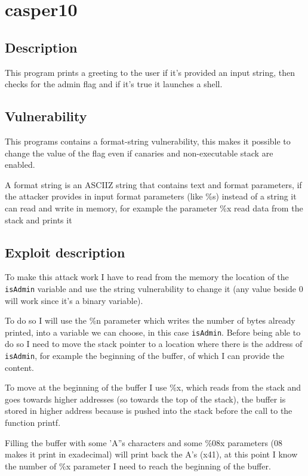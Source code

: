 \documentclass[a4paper,12pt]{article}
\begin{document}
\section{casper10}

\subsection{Description}
This program prints a greeting to the user if it's provided an input string, then checks for the admin flag and if it's true it launches a shell. 



\subsection{Vulnerability}

This programs contains a format-string vulnerability, this makes it possible to change the value of the flag even if canaries and non-executable stack are enabled.

A format string is an ASCIIZ string that contains text and format parameters, if the attacker provides in input format parameters (like \%s) instead of a string it can read and write in memory, for example the parameter \%x read data from the stack and prints it %

\subsection{Exploit description}

To make this attack work I have to read from the memory the location of the \texttt{isAdmin} variable and use the string vulnerability to change it (any value beside 0 will work since it's a binary variable). 

To do so I will use the \%n parameter which writes the number of bytes already printed, into a variable we can choose, in this case \texttt{isAdmin}. Before being able to do so I need to move the stack pointer to a location where there is the address of \texttt{isAdmin}, for example the beginning of the buffer, of which I can provide the content.

To move at the beginning of the buffer I use \%x, which reads from the stack and goes towards higher addresses (so towards the top of the stack), the buffer is stored in higher address because is pushed into the stack before the call to the function printf.

Filling the buffer with some 'A''s characters and some \%08x parameters (08 makes it print in exadecimal) will print back the A's (x41), at this point I know the number of \%x parameter I need to reach the beginning of the buffer.
\end{document}
